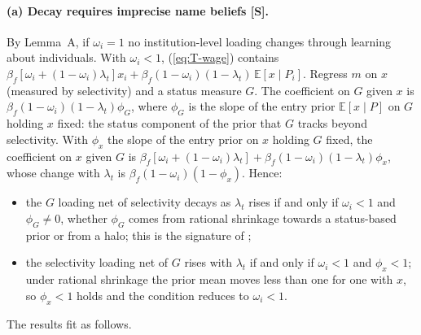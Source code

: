 \documentclass[11pt]{article}
\begin{document}
\paragraph{(a) Decay requires imprecise name beliefs [S].} By Lemma~A, if $\omega_i=1$ no institution-level
loading changes through learning about individuals. With $\omega_i<1$, (\ref{eq:T-wage}) contains
$\beta_f[\omega_i+(1-\omega_i)\lambda_t]x_i+\beta_f(1-\omega_i)(1-\lambda_t)\,\mathbb E[x\mid P_i]$. Regress $m$ on
$x$ (measured by selectivity) and a status measure $G$. The coefficient on $G$ given $x$ is
$\beta_f(1-\omega_i)(1-\lambda_t)\phi_G$, where $\phi_G$ is the slope of the entry prior $\mathbb E[x\mid P]$ on $G$
holding $x$ fixed: the status component of the prior that $G$ tracks beyond selectivity. With $\phi_x$ the slope of
the entry prior on $x$ holding $G$ fixed, the coefficient on $x$ given $G$ is
$\beta_f[\omega_i+(1-\omega_i)\lambda_t]+\beta_f(1-\omega_i)(1-\lambda_t)\phi_x$, whose change with $\lambda_t$ is
$\beta_f(1-\omega_i)(1-\phi_x)$. Hence:
\begin{itemize}
\item the $G$ loading net of selectivity decays as $\lambda_t$ rises if and only if $\omega_i<1$ and $\phi_G\neq0$,
whether $\phi_G$ comes from rational shrinkage towards a status-based prior or from a halo; this is the signature
of \citet{altonji2001employer};
\item the selectivity loading net of $G$ rises with $\lambda_t$ if and only if $\omega_i<1$ and $\phi_x<1$; under
rational shrinkage the prior mean moves less than one for one with $x$, so $\phi_x<1$ holds and the condition
reduces to $\omega_i<1$.
\end{itemize}
The results fit as follows.
\end{document}
